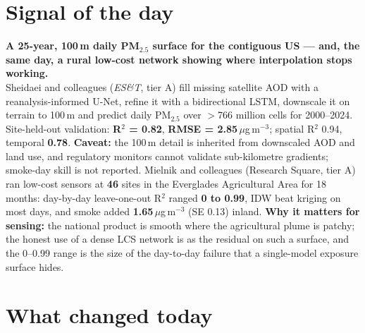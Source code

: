 \documentclass[10pt]{article}
\begin{document}
\vspace{6mm}

\section*{\sffamily\bfseries\color{Deep}Signal of the day}
\vspace{-1.5mm}{\color{Amber}\rule{\linewidth}{1.1pt}}\vspace{2.5mm}

\begin{keybox}
{\sffamily\bfseries\small\color{Deep}A 25-year, 100\,m daily PM$_{2.5}$ surface for the contiguous US
--- and, the same day, a rural low-cost network showing where interpolation stops working.}\\[1.4mm]
\footnotesize
Sheidaei and colleagues (\textit{ES\&T}, tier A) fill missing satellite AOD with a reanalysis-informed U-Net,
refine it with a bidirectional LSTM, downscale it on terrain to 100\,m and predict daily PM$_{2.5}$ over
$>$766 million cells for 2000--2024. Site-held-out validation: \textbf{R$^2$ = 0.82}, \textbf{RMSE = 2.85}\,$\mu$g\,m$^{-3}$;
spatial R$^2$ 0.94, temporal \textbf{0.78}. \textbf{Caveat:} the 100\,m detail is inherited from downscaled AOD
and land use, and regulatory monitors cannot validate sub-kilometre gradients; smoke-day skill is not
reported. Mielnik and colleagues (Research Square, tier A) ran low-cost sensors at \textbf{46} sites in the
Everglades Agricultural Area for 18 months: day-by-day leave-one-out R$^2$ ranged \textbf{0 to 0.99},
IDW beat kriging on most days, and smoke added \textbf{1.65}\,$\mu$g\,m$^{-3}$ (SE 0.13) inland.
\textbf{Why it matters for sensing:} the national product is smooth where the agricultural plume is
patchy; the honest use of a dense LCS network is as the residual on such a surface, and the 0--0.99 range is
the size of the day-to-day failure that a single-model exposure surface hides.\par
\end{keybox}

\vspace{3mm}

\section*{\sffamily\bfseries\color{Deep}What changed today}
\vspace{-1.5mm}{\color{Amber}\rule{\linewidth}{1.1pt}}\vspace{2.5mm}
\end{document}
